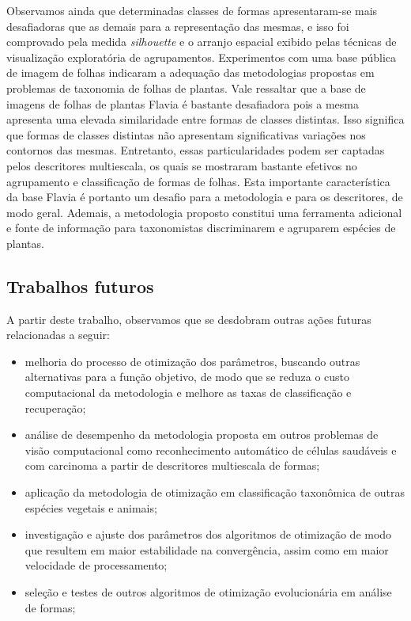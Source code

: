 Observamos ainda que determinadas classes de formas apresentaram-se mais desafiadoras que as demais para a representação das mesmas, e isso foi comprovado pela medida \textit{silhouette}  e o arranjo espacial exibido pelas técnicas de visualização exploratória de agrupamentos.
Experimentos com uma base pública de imagem de folhas indicaram a adequação das metodologias propostas em problemas de taxonomia de folhas de plantas. Vale ressaltar que a base de imagens de folhas de plantas Flavia é bastante desafiadora pois a mesma apresenta uma elevada similaridade entre formas de classes distintas. Isso significa que formas de classes distintas não apresentam significativas variações nos contornos das mesmas. Entretanto, essas particularidades podem ser captadas pelos descritores multiescala, os quais se mostraram bastante efetivos no agrupamento e classificação de formas de folhas.
Esta importante característica da base Flavia é portanto um desafio para a metodologia e  para os descritores, de modo geral. 
Ademais, a metodologia proposto constitui uma ferramenta adicional e fonte de informação para taxonomistas discriminarem e agruparem espécies de plantas. 


\subsection{Trabalhos futuros}
A partir deste trabalho, observamos que se desdobram outras ações futuras relacionadas a seguir: 
\begin{itemize}

\item melhoria do processo de otimização dos parâmetros, buscando outras alternativas para a função objetivo, de modo que se reduza o custo computacional da metodologia e melhore as taxas de classificação e recuperação;

\item análise de desempenho da metodologia proposta em outros problemas de visão computacional como reconhecimento automático de células saudáveis e com carcinoma a partir de descritores multiescala de formas;

\item aplicação da metodologia de otimização em classificação taxonômica de outras espécies vegetais e animais;

\item investigação e ajuste dos parâmetros dos algoritmos de otimização de modo que resultem em maior estabilidade na convergência, assim como em maior velocidade de processamento;

\item seleção e testes de outros algoritmos de otimização evolucionária em análise  de formas;

\end{itemize}


